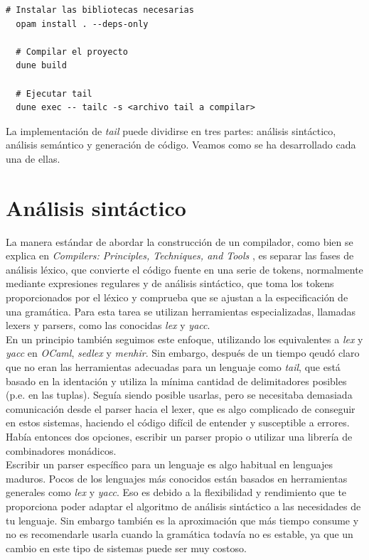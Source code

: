 \begin{lstlisting}[style=Consola]
  # Instalar las bibliotecas necesarias
  opam install . --deps-only
  
  # Compilar el proyecto
  dune build
  
  # Ejecutar tail
  dune exec -- tailc -s <archivo tail a compilar>
\end{lstlisting}

La implementación de \textit{tail} puede dividirse en tres partes: análisis sintáctico, análisis semántico y generación de código. Veamos como se ha desarrollado cada una de ellas.\\


\section{Análisis sintáctico}

La manera estándar de abordar la construcción de un compilador, como bien se explica en \textit{Compilers: Principles, Techniques, and Tools} \cite{dragoonBook}, es separar las fases de análisis léxico, que convierte el código fuente en una serie de tokens, normalmente mediante expresiones regulares y de análisis sintáctico, que toma los tokens proporcionados por el léxico y comprueba que se ajustan a la especificación de una gramática. Para esta tarea se utilizan herramientas especializadas, llamadas lexers y parsers, como las conocidas \textit{lex} y \textit{yacc}.\\

En un principio también seguimos este enfoque, utilizando los equivalentes a \textit{lex} y \textit{yacc} en \textit{OCaml}, \textit{sedlex} y \textit{menhir}. Sin embargo, después de un tiempo qeudó claro que no eran las herramientas adecuadas para un lenguaje como \textit{tail}, que está basado en la identación y utiliza la mínima cantidad de delimitadores posibles (p.e. en las tuplas). Seguía siendo posible usarlas, pero se necesitaba demasiada comunicación desde el parser hacia el lexer, que es algo complicado de conseguir en estos sistemas, haciendo el código difícil de entender y susceptible a errores. Había entonces dos opciones, escribir un parser propio o utilizar una librería de combinadores monádicos.\\

Escribir un parser específico para un lenguaje es algo habitual en lenguajes maduros. Pocos de los lenguajes más conocidos están basados en herramientas generales como \textit{lex} y \textit{yacc}. Eso es debido a la flexibilidad y rendimiento que te proporciona poder adaptar el algoritmo de análisis sintáctico a las necesidades de tu lenguaje. Sin embargo también es la aproximación que más tiempo consume y no es recomendarle usarla cuando la gramática todavía no es estable, ya que un cambio en este tipo de sistemas puede ser muy costoso.\\

